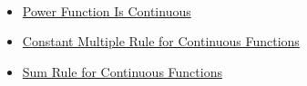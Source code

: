 \begin{remark*}[Dependencies]~\\
\begin{itemize}
  \item \hyperref[lem:power-function-continuous]{Power Function Is Continuous}
  \item \hyperref[thm:constant-multiple-rule-continuous]{Constant Multiple Rule for Continuous Functions}
  \item \hyperref[thm:sum-rule-continuous-functions]{Sum Rule for Continuous Functions}
\end{itemize}
\end{remark*}
